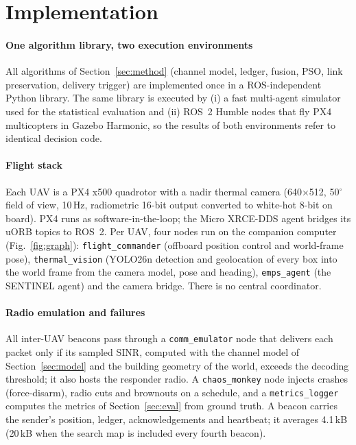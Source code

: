\section{Implementation}\label{sec:impl}

\paragraph{One algorithm library, two execution environments}
All algorithms of Section~\ref{sec:method} (channel model, ledger, fusion, PSO, link preservation,
delivery trigger) are implemented once in a ROS-independent Python library. The same library is
executed by (i) a fast multi-agent simulator used for the statistical evaluation and (ii) ROS~2
Humble nodes that fly PX4 multicopters in Gazebo Harmonic, so the results of both environments
refer to identical decision code.

\paragraph{Flight stack}
Each UAV is a PX4 x500 quadrotor with a nadir thermal camera (640$\times$512, 50$^\circ$ field of
view, 10\,Hz, radiometric 16-bit output converted to white-hot 8-bit on board). PX4 runs as
software-in-the-loop; the Micro XRCE-DDS agent bridges its uORB topics to ROS~2. Per UAV, four nodes
run on the companion computer (Fig.~\ref{fig:graph}): \texttt{flight\_commander} (offboard position
control and world-frame pose), \texttt{thermal\_vision} (YOLO26n detection and geolocation of every
box into the world frame from the camera model, pose and heading), \texttt{emps\_agent} (the
SENTINEL agent) and the camera bridge. There is no central coordinator.

\paragraph{Radio emulation and failures}
All inter-UAV beacons pass through a \texttt{comm\_emulator} node that delivers each packet only if
its sampled SINR, computed with the channel model of Section~\ref{sec:model} and the building
geometry of the world, exceeds the decoding threshold; it also hosts the responder radio. A
\texttt{chaos\_monkey} node injects crashes (force-disarm), radio cuts and brownouts on a schedule,
and a \texttt{metrics\_logger} computes the metrics of Section~\ref{sec:eval} from ground truth. A
beacon carries the sender's position, ledger, acknowledgements and heartbeat; it averages 4.1\,kB
(20\,kB when the search map is included every fourth beacon).

